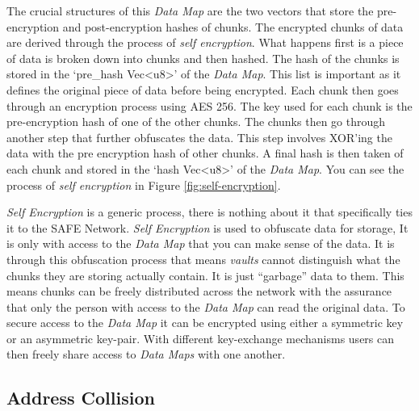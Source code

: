 The crucial structures of this \textit{Data Map} are the two vectors that store the pre-encryption and post-encryption hashes of chunks. The encrypted chunks of data are derived through the process of \textit{self encryption}. What happens first is a piece of data is broken down into chunks and then hashed. The hash of the chunks is stored in the `pre\_hash Vec\textless u8\textgreater' of the \textit{Data Map}. This list is important as it defines the original piece of data before being encrypted. Each chunk then goes through an encryption process using AES 256. The key used for each chunk is the pre-encryption hash of one of the other chunks. The chunks then go through another step that further obfuscates the data. This step involves XOR'ing the data with the pre encryption hash of other chunks. A final hash is then taken of each chunk and stored in the `hash Vec\textless u8\textgreater' of the \textit{Data Map}. You can see the process of \textit{self encryption} in Figure \ref{fig:self-encryption}.

\textit{Self Encryption} is a generic process, there is nothing about it that specifically ties it to the SAFE Network. \textit{Self Encryption} is used to obfuscate data for storage, It is only with access to the \textit{Data Map} that you can make sense of the data. It is through this obfuscation process that means \textit{vaults} cannot distinguish what the chunks they are storing actually contain. It is just ``garbage'' data to them. This means chunks can be freely distributed across the network with the assurance that only the person with access to the \textit{Data Map} can read the original data. To secure access to the \textit{Data Map} it can be encrypted using either a symmetric key or an asymmetric key-pair. With different key-exchange mechanisms users can then freely share access to \textit{Data Maps} with one another.

\subsection{Address Collision}
\label{subsec:address-collision}

